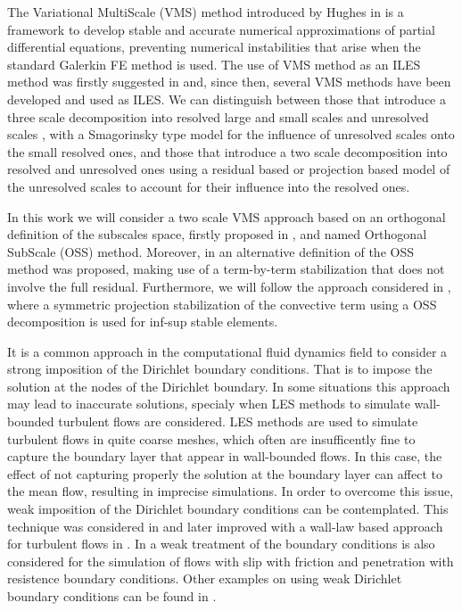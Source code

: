 The Variational MultiScale (VMS) method introduced by Hughes in \cite{hughes_multiscale_1995,hughes_variational_1998} is a framework to develop stable and accurate numerical approximations of partial differential equations, preventing numerical instabilities that arise when the standard Galerkin FE method is used. The use of VMS method as an ILES method was firstly suggested in \cite{hughes_multiscale_2001,hughes_large_2001,codina_stabilized_2002} and, since then, several VMS methods have been developed and used as ILES. We can distinguish between those that introduce a three scale decomposition into resolved large and small scales and unresolved scales \cite{koobus_variational_2004,john_variants_2008, john_numerical_2010, masud_variational_2011}, with a Smagorinsky type model for the influence of unresolved scales onto the small resolved ones, and those that introduce a two scale decomposition into resolved and unresolved ones \cite{bazilevs_variational_2007,colomes_assessment_2015} using a residual based or projection based model of the unresolved scales to account for their influence into the resolved ones.

In this work we will consider a two scale VMS approach based on an orthogonal definition of the subscales space, firstly proposed in \cite{codina_stabilization_2000}, and named Orthogonal SubScale (OSS) method. Moreover, in \cite{codina_analysis_2008} an alternative definition of the OSS method was proposed, making use of a term-by-term stabilization that does not involve the full residual. Furthermore, we will follow the approach considered in \cite{colomes_mixed}, where a symmetric projection stabilization of the convective term using a OSS decomposition is used for inf-sup stable elements.

It is a common approach in the computational fluid dynamics field to consider a strong imposition of the Dirichlet boundary conditions. That is to impose the solution at the nodes of the Dirichlet boundary. In some situations this approach may lead to inaccurate solutions, specialy when LES methods to simulate wall-bounded turbulent flows are considered. LES methods are used to simulate turbulent flows in quite coarse meshes, which often are insufficently fine to capture the boundary layer that appear in wall-bounded flows. In this case, the effect of not capturing properly the solution at the boundary layer can affect to the mean flow, resulting in imprecise simulations. In order to overcome this issue, weak imposition of the Dirichlet boundary conditions can be contemplated. This technique was considered in \cite{bazilevs_2007CF} and later improved with a wall-law based approach for turbulent flows in \cite{bazilevs_2007CMAME}. In \cite{v_John_2002} a weak treatment of the boundary conditions is also considered for the simulation of flows with slip with friction and penetration with resistence boundary conditions. Other examples on using weak Dirichlet boundary conditions can be found in \cite{CHALMERS,DASSAULT}.

